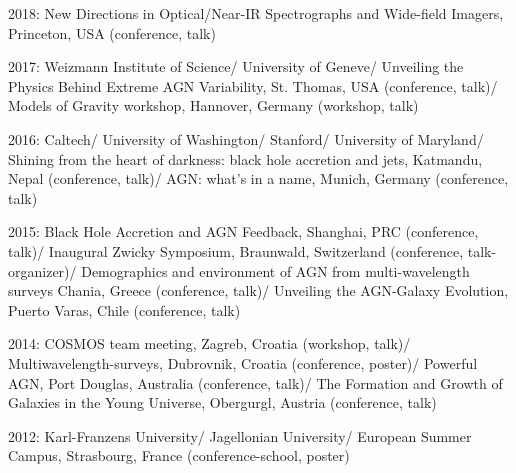 \documentclass[11pt,letterpaper]{article}
\renewenvironment{itemize}{
  \begin{list}{}{
    \setlength{\leftmargin}{1.5em}
    \setlength{\itemsep}{0.10em}
    \setlength{\parskip}{0pt}
    \setlength{\parsep}{0.10em}
  }
}{
  \end{list}
}
\begin{document}
\begin{itemize}
\item 2018:  New Directions in Optical/Near-IR Spectrographs and Wide-field Imagers, Princeton, USA (conference, talk)

\item 2017:  Weizmann Institute of Science/ University of Geneve/ Unveiling the Physics Behind Extreme AGN Variability, St. Thomas, USA (conference, talk)/ Models of Gravity workshop, Hannover, Germany (workshop, talk)
\item 2016: Caltech/ University of Washington/ Stanford/ University of Maryland/ Shining from the heart of darkness: black hole accretion and jets, Katmandu, Nepal (conference, talk)/ AGN: what's in a name, Munich, Germany (conference, talk)
\item 2015:
Black Hole Accretion and AGN Feedback, Shanghai, PRC (conference, talk)/ Inaugural Zwicky Symposium, Braunwald, Switzerland (conference, talk-organizer)/ Demographics and environment of AGN from multi-wavelength surveys Chania, Greece (conference, talk)/ Unveiling the AGN-Galaxy Evolution, Puerto Varas, Chile (conference, talk)
\item 2014:
COSMOS team meeting, Zagreb, Croatia (workshop, talk)/ Multiwavelength-surveys, Dubrovnik, Croatia (conference, poster)/ Powerful AGN, Port Douglas, Australia (conference, talk)/ The Formation and
Growth of Galaxies in the Young Universe, Obergurgl, Austria (conference, talk)
\item 2012:
Karl-Franzens University/ Jagellonian University/
European Summer Campus, Strasbourg, France (conference-school, poster)
\end{itemize}



\end{document}
